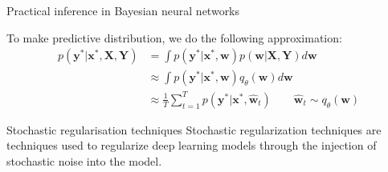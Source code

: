 \documentclass{beamer}
\begin{document}
\begin{frame}[allowframebreaks]{Practical inference in Bayesian neural networks}
\framebreak

To make predictive distribution, we do the following approximation:
\begin{align*}
p(\mathbf{y}^\ast | \mathbf{x}^\ast, \mathbf{X}, \mathbf{Y}) & = \int p(\mathbf{y}^\ast | \mathbf{x}^\ast, \mathbf{w}) p(\mathbf{w} | \mathbf{X}, \mathbf{Y}) d\mathbf{w} \\ 
& \approx \int p(\mathbf{y}^\ast | \mathbf{x}^\ast, \mathbf{w}) q_\theta(\mathbf{w})d\mathbf{w} \\ 
& \approx \frac{1}{T} \sum_{t=1}^T p(\mathbf{y}^\ast | \mathbf{x}^\ast, \hat{\mathbf{w}}_t)  \qquad \hat{\mathbf{w}}_t \sim q_\theta(\mathbf{w})
\end{align*}

\end{frame}

\begin{frame}[allowframebreaks]{Stochastic regularisation techniques}
Stochastic regularization techniques are techniques used to regularize deep learning models through the injection of stochastic noise into the model.

\end{frame}
\end{document}
